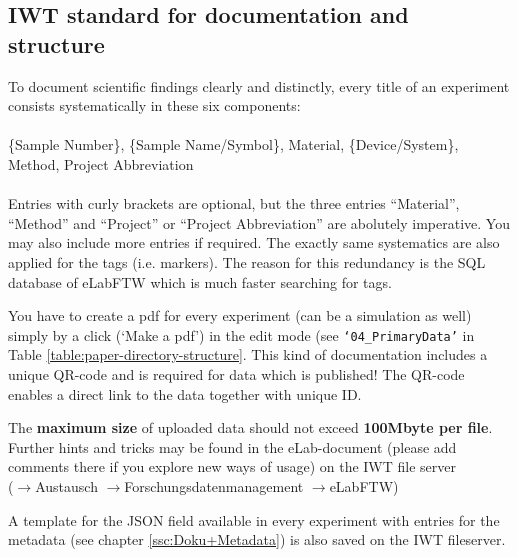 \subsection{IWT standard for documentation and structure}

To document scientific findings clearly and distinctly, every title of an experiment consists systematically in these six components: \\
 \\
\{Sample Number\}, \{Sample Name/Symbol\}, Material, \{Device/System\}, Method, Project Abbreviation \\
 \\
Entries with curly brackets are optional, but the three entries ``Material'', ``Method'' and ``Project'' or ``Project Abbreviation'' are abolutely imperative. You may also include more entries if required. The exactly same systematics are also applied for the tags (i.e. markers). The reason for this redundancy is the SQL database of eLabFTW which is much faster searching for tags.

You have to create a pdf for every experiment (can be a simulation as well) simply by a click (`Make a pdf’) in the edit mode (see \texttt{‘04\_PrimaryData’} in Table \ref{table:paper-directory-structure}. This kind of documentation includes a unique QR-code and is required for data which is published! The QR-code enables a direct link to the data together with unique ID.

The \textbf{maximum size} of uploaded data should not exceed
\textbf{100Mbyte per file}. Further hints and tricks may be found in the eLab-document (please add comments there if you explore new ways of usage) on the IWT file server   \\ ($\rightarrow$Austausch $\rightarrow$Forschungsdatenmanagement $\rightarrow$eLabFTW)

A template for the JSON field available in every experiment with entries for the metadata (see chapter \ref{ssc:Doku+Metadata}) is also saved on the IWT fileserver.

